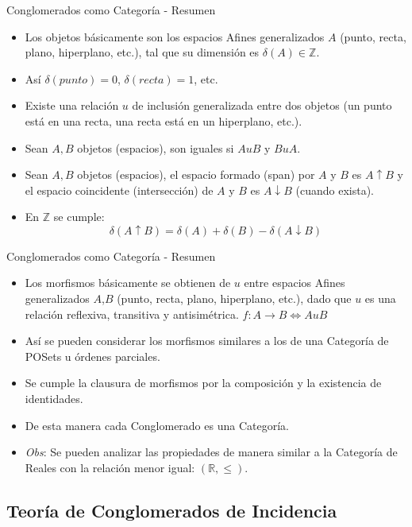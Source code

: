 \documentclass{beamer}
\newcommand{\Z}{\mathbb{Z}}
\newcommand{\R}{\mathbb{R}}
\newcommand{\func}[3]{#1\colon #2\to#3}
\begin{document}
\begin{frame}{Conglomerados como Categoría - Resumen}
\begin{itemize}
    \item Los objetos básicamente son los espacios Afines generalizados $A$ (punto, recta, plano, hiperplano, etc.), tal que su dimensión es $\delta(A) \in \Z$.
    \item Así $\delta(\textit{punto})=0$, $\delta(\textit{recta})=1$, etc.
    \item Existe una relación $u$ de inclusión generalizada entre dos objetos (un punto está en una recta, una recta está en un hiperplano, etc.).
    \item Sean $A,B$ objetos (espacios), son iguales si $A u B$ y $B u A$.
    \item Sean $A,B$ objetos (espacios), el espacio formado (span) por $A$ y $B$ es $A \uparrow B$ y el espacio coincidente (intersección) de $A$ y $B$ es $A \downarrow B$ (cuando exista).
    \item En $\Z$ se cumple:
    \[ \delta (A \uparrow B) = \delta(A) + \delta(B) - \delta(A \downarrow B) \]
 \end{itemize}
	
\end{frame}

\begin{frame}{Conglomerados como Categoría - Resumen}
\begin{itemize}
    \item Los morfismos básicamente se obtienen de $u$ entre espacios Afines generalizados $A$,$B$ (punto, recta, plano, hiperplano, etc.), dado que $u$ es una relación reflexiva, transitiva y antisimétrica.
    $\func{f}{A}{B} \Longleftrightarrow AuB$
    \item Así se pueden considerar los morfismos similares a los de una Categoría de POSets u órdenes parciales.
    \item Se cumple la clausura de morfismos por la composición y la existencia de identidades.
    \item De esta manera cada Conglomerado es una Categoría.
    \item \textit{Obs}: Se pueden analizar las propiedades de manera similar a la Categoría de Reales con la relación menor igual: $(\R,\le)$.
 \end{itemize}
\end{frame}

\subsection{Teoría de Conglomerados de Incidencia}
\end{document}
